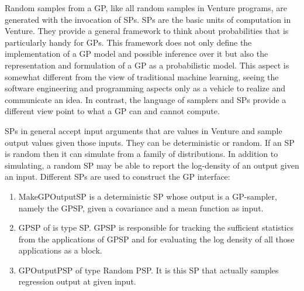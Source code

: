 Random samples from a \ac{GP}, like all random samples in Venture programs,
are generated with the invocation of \ac{SP}s. \ac{SP}s are the basic units of
computation in Venture. They provide a general framework to think about
probabilities that is particularly handy for \ac{GP}s. This framework does not
only define the implementation of a \ac{GP} model and possible inference over it but also
the representation and formulation of a \ac{GP} as a probabilistic model.
This aspect is somewhat different from the view of traditional machine learning,
seeing the software engineering and programming aspects only as a vehicle to
realize and communicate an idea.  In contrast, the language of samplers and \ac{SP}s provide a
different view point to what a \ac{GP} can and cannot compute.

\ac{SP}s in general accept input arguments that are values in Venture and sample output
values given those inputs. They can be deterministic or random. If an \ac{SP} is random
then it can simulate from a family of distributions. In addition to simulating,
a random \ac{SP} may be able to report the log-density of an output given an input.
Different \ac{SP}s are used to construct the \ac{GP} interface:
\begin{enumerate}
  \item MakeGPOutputSP is a deterministic \ac{SP} whose output is a
    \ac{GP}-sampler, namely the GPSP, given a covariance and a mean function as input. 
\item GPSP of is type SP\@. GPSP is responsible for tracking the sufficient statistics
from the applications of GPSP and for evaluating the log density of all those
applications as a block.
\item GPOutputPSP of type Random PSP\@.  It is this SP that actually samples
regression output at given input.
\end{enumerate}





